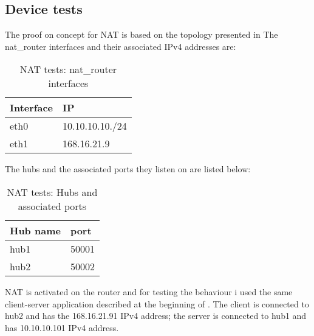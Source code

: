 {{\subsection{Device tests}
\label{sub-sec:nat-tests}
The proof on concept for NAT is based on the topology presented in 
The nat_router interfaces and their associated IPv4 addresses are:
\begin{center}
  \begin{table}[htb]
  \begin{center}
  \begin{tabular}{| l | l | }
    \hline
      Interface & IP \\ \hline
      eth0 & 10.10.10.10./24 \\ \hline
      eth1 & 168.16.21.9\\ \hline
    \hline
  \end{tabular}
  \end{center}
  \caption{NAT tests: nat_router interfaces}
  \label{table:nat-top}
  \end{table}
\end{center}
The hubs and the associated ports they listen on are listed below:
\begin{center}
  \begin{table}[htb]
  \begin{center}
  \begin{tabular}{| l | l | }
    \hline
      Hub name & port \\ \hline
      hub1 & 50001 \\ \hline
      hub2 & 50002\\ \hline
    \hline
  \end{tabular}
  \end{center}
  \caption{NAT tests: Hubs and associated ports}
  \label{table:nat-hubs}
  \end{table}
\end{center}

NAT is activated on the router and for testing the behaviour i used the same client-server application described at the beginning of . The client is connected to hub2 and has the 168.16.21.91 IPv4 address; the server is connected to hub1 and has 10.10.10.101 IPv4 address.

}}
